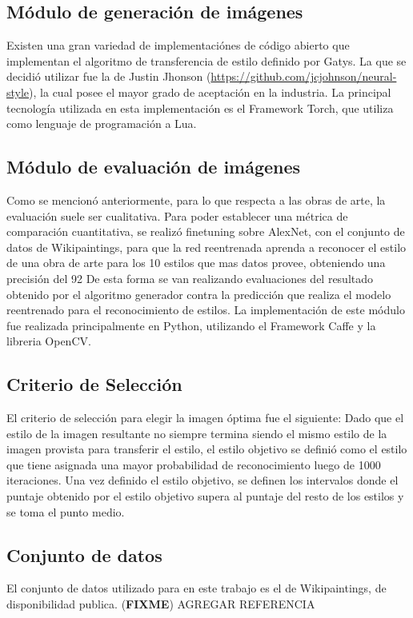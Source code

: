 \documentclass[a4paper,11pt,spanish]{book}
\newcommand*{\FIXME}[1]{{(\textbf{FIXME}) {#1}}}
\begin{document}
    \subsection{Módulo de generación de imágenes}
      Existen una gran variedad de implementaciónes de código abierto que implementan el algoritmo de transferencia de estilo definido por Gatys.
      La que se decidió utilizar fue la de Justin Jhonson (\url{https://github.com/jcjohnson/neural-style}), la cual posee el mayor grado de aceptación en la industria.
      La principal tecnología utilizada en esta implementación es el Framework Torch, que utiliza como lenguaje de programación a Lua.
    \subsection{Módulo de evaluación de imágenes}
      Como se mencionó anteriormente, para lo que respecta a las obras de arte, la evaluación suele ser cualitativa.
      Para poder establecer una métrica de comparación cuantitativa, se realizó finetuning sobre AlexNet, con el conjunto de datos de Wikipaintings, para que la red reentrenada aprenda a reconocer
      el estilo de una obra de arte para los 10 estilos que mas datos provee, obteniendo una precisión del 92%
      De esta forma se van realizando evaluaciones del resultado obtenido por el algoritmo generador contra la predicción que realiza el modelo reentrenado para el reconocimiento de estilos.
      La implementación de este módulo fue realizada principalmente en Python, utilizando el Framework Caffe y la libreria OpenCV.
    \subsection{Criterio de Selección}
      El criterio de selección para elegir la imagen óptima fue el siguiente:
      Dado que el estilo de la imagen resultante no siempre termina siendo el mismo estilo de la imagen provista para transferir el estilo, el estilo objetivo se definió como el estilo
      que tiene asignada una mayor probabilidad de reconocimiento luego de 1000 iteraciones.
      Una vez definido el estilo objetivo, se definen los intervalos donde el puntaje obtenido por el estilo objetivo supera al puntaje del resto de los estilos y se toma el punto medio.

    \subsection{Conjunto de datos}
      El conjunto de datos utilizado para en este trabajo es el de Wikipaintings, de disponibilidad publica. \FIXME{AGREGAR REFERENCIA}
\end{document}
